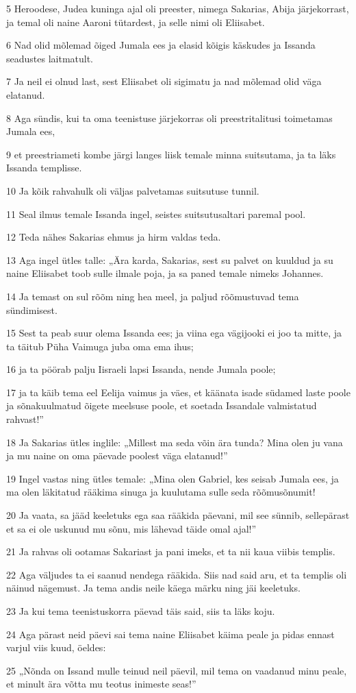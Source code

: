 \par 5 Heroodese, Judea kuninga ajal oli preester, nimega Sakarias, Abija järjekorrast, ja temal oli naine Aaroni tütardest, ja selle nimi oli Eliisabet.
\par 6 Nad olid mõlemad õiged Jumala ees ja elasid kõigis käskudes ja Issanda seadustes laitmatult.
\par 7 Ja neil ei olnud last, sest Eliisabet oli sigimatu ja nad mõlemad olid väga elatanud.
\par 8 Aga sündis, kui ta oma teenistuse järjekorras oli preestritalitusi toimetamas Jumala ees,
\par 9 et preestriameti kombe järgi langes liisk temale minna suitsutama, ja ta läks Issanda templisse.
\par 10 Ja kõik rahvahulk oli väljas palvetamas suitsutuse tunnil.
\par 11 Seal ilmus temale Issanda ingel, seistes suitsutusaltari paremal pool.
\par 12 Teda nähes Sakarias ehmus ja hirm valdas teda.
\par 13 Aga ingel ütles talle: „Ära karda, Sakarias, sest su palvet on kuuldud ja su naine Eliisabet toob sulle ilmale poja, ja sa paned temale nimeks Johannes.
\par 14 Ja temast on sul rõõm ning hea meel, ja paljud rõõmustuvad tema sündimisest.
\par 15 Sest ta peab suur olema Issanda ees; ja viina ega vägijooki ei joo ta mitte, ja ta täitub Püha Vaimuga juba oma ema ihus;
\par 16 ja ta pöörab palju Iisraeli lapsi Issanda, nende Jumala poole;
\par 17 ja ta käib tema eel Eelija vaimus ja väes, et käänata isade südamed laste poole ja sõnakuulmatud õigete meelsuse poole, et soetada Issandale valmistatud rahvast!”
\par 18 Ja Sakarias ütles inglile: „Millest ma seda võin ära tunda? Mina olen ju vana ja mu naine on oma päevade poolest väga elatanud!”
\par 19 Ingel vastas ning ütles temale: „Mina olen Gabriel, kes seisab Jumala ees, ja ma olen läkitatud rääkima sinuga ja kuulutama sulle seda rõõmusõnumit!
\par 20 Ja vaata, sa jääd keeletuks ega saa rääkida päevani, mil see sünnib, sellepärast et sa ei ole uskunud mu sõnu, mis lähevad täide omal ajal!”
\par 21 Ja rahvas oli ootamas Sakariast ja pani imeks, et ta nii kaua viibis templis.
\par 22 Aga väljudes ta ei saanud nendega rääkida. Siis nad said aru, et ta templis oli näinud nägemust. Ja tema andis neile käega märku ning jäi keeletuks.
\par 23 Ja kui tema teenistuskorra päevad täis said, siis ta läks koju.
\par 24 Aga pärast neid päevi sai tema naine Eliisabet käima peale ja pidas ennast varjul viis kuud, öeldes:
\par 25 „Nõnda on Issand mulle teinud neil päevil, mil tema on vaadanud minu peale, et minult ära võtta mu teotus inimeste seas!”

